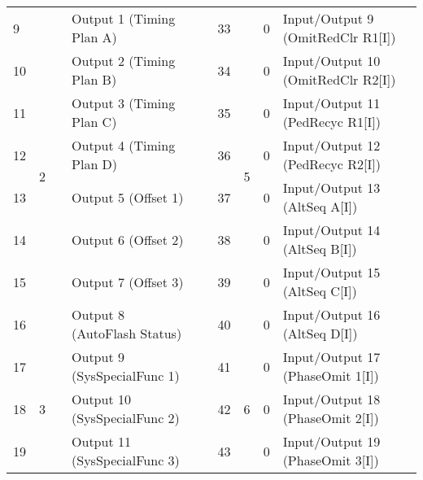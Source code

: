 \documentclass[]{article}
\begin{document}
\begin{landscape}
\begin{table}[]
\begin{tabular}{lllllllll}
			9            & \multirow{8}{*}{2} & \multirow{8}{*}{} & Output 1 (Timing Plan A)      &                   & 33  & \multirow{8}{*}{5} & 0                 & Input/Output 9 (OmitRedClr R1{[}I{]})  \\
			10           &                    &                   & Output 2 (Timing Plan B)      &                   & 34  &                    & 0                 & Input/Output 10 (OmitRedClr R2{[}I{]}) \\
			11           &                    &                   & Output 3 (Timing Plan C)      &                   & 35  &                    & 0                 & Input/Output 11 (PedRecyc R1{[}I{]})   \\
			12           &                    &                   & Output 4 (Timing Plan D)      &                   & 36  &                    & 0                 & Input/Output 12 (PedRecyc R2{[}I{]})   \\
			13           &                    &                   & Output 5 (Offset 1)           &                   & 37  &                    & 0                 & Input/Output 13 (AltSeq A{[}I{]})      \\
			14           &                    &                   & Output 6 (Offset 2)           &                   & 38  &                    & 0                 & Input/Output 14 (AltSeq B{[}I{]})      \\
			15           &                    &                   & Output 7 (Offset 3)           &                   & 39  &                    & 0                 & Input/Output 15 (AltSeq C{[}I{]})      \\
			16           &                    &                   & Output 8 (AutoFlash Status)   &                   & 40  &                    & 0                 & Input/Output 16 (AltSeq D{[}I{]})      \\ \cline{1-4} \cline{6-9} 
			17           & \multirow{8}{*}{3} &                   & Output 9 (SysSpecialFunc 1)   &                   & 41  & \multirow{8}{*}{6} & 0                 & Input/Output 17 (PhaseOmit 1{[}I{]})   \\
			18           &                    &                   & Output 10 (SysSpecialFunc 2)  &                   & 42  &                    & 0                 & Input/Output 18 (PhaseOmit 2{[}I{]})   \\
			19           &                    &                   & Output 11 (SysSpecialFunc 3)  &                   & 43  &                    & 0                 & Input/Output 19 (PhaseOmit 3{[}I{]})   \\

\end{tabular}
\end{table}
\end{landscape}
\end{document}
